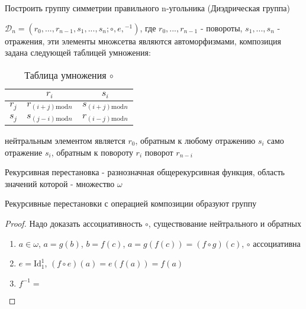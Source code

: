 \documentclass[../main/document.tex]{subfiles}
\begin{document}
\begin{exm}
Построить группу симметрии правильного n-угольника (Диэдрическая группа)

$\mathcal{D}_n=({r_0,...,r_{n-1},s_1,...,s_n};\circ,e,{ }^{-1})$, где $r_0,...,r_{n-1}$ - повороты, $s_1,...,s_n$ - отражения, эти элементы множсетва являются автоморфизмами, композиция задана следующей таблицей умножения:
\begin{table}[H]
\centering
\caption*{Таблица умножения $\circ$}
\renewcommand*{\arraystretch}{1.4}
\begin{tabular}{c|c|c}
  & $r_i$ & $s_i$   \\ \hline
$r_j$ & $r_{(i+j)\mathrm{mod}n}$ & $s_{(i+j)\mathrm{mod}n}$  \\ \hline
$s_j$ & $s_{(j-i)\mathrm{mod}n}$ & $r_{(i-j)\mathrm{mod}n}$ \\
\end{tabular}
\end{table}
нейтральным элементом является $r_0$, обратным к любому отражению $s_i$ само отражение $s_i$, обратным к повороту $r_i$ поворот $r_{n-i}$
\end{exm}
\begin{dfn}
Рекурсивная перестановка - разнозначная общерекурсивная функция, область значений которой - множество $\omega$ 
\end{dfn}
\begin{thm}
Рекурсивные перестановки с операцией композиции образуют группу
\begin{proof}
Надо доказать ассоциативность $\circ$, существование нейтрального и обратных
\begin{enumerate}
\item $a\in \omega$, $a=g(b)$, $b=f(c)$, $a=g(f(c))=(f\circ g)(c)$, $\circ$ ассоциативна
\item $e=\mathrm{Id}^1_1$, $(f\circ e)(a)=e(f(a))=f(a)$
\item $f^{-1}=$
\end{enumerate}
\end{proof}
\end{thm}
\end{document}
